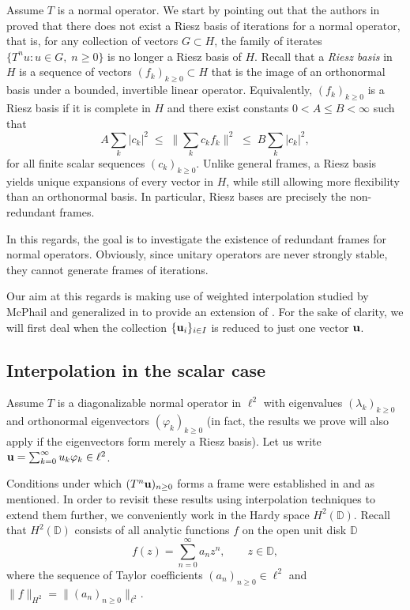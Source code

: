 \documentclass[11pt]{amsart}
\theoremstyle{definition}
\theoremstyle{remark}
\numberwithin{equation}{section}
\def\DD{{\mathbb D}}
\def\phi{\varphi}
\newcommand{\uu}{\textnormal{\textbf{u}} }
\begin{document}
{\smallskip

Assume $T$ is a normal operator. We start  by pointing out that the authors in \cite{ACCMP17} proved  that there does not exist a Riesz basis of iterations
for a normal operator, that is, for any collection of vectors $G \subset H$, the family of iterates $\{T^n u : u \in G,\; n \ge 0\}$ is no longer a Riesz basis of $H$. Recall that a \emph{Riesz basis} in $H$ is a sequence of vectors
$(f_k)_{k\geq 0}\subset H$ that is the image of an orthonormal basis under a bounded,
invertible linear operator. Equivalently, $(f_k)_{k\geq 0}$ is a Riesz basis if it is complete
in $H$ and there exist constants $0<A\le B<\infty$ such that
\[
A \sum_k |c_k|^2 \;\le\;
\Big\|\sum_k c_k f_k\Big\|^2
\;\le\;
B \sum_k |c_k|^2,
\]
for all finite scalar sequences $(c_k)_{k\geq 0}$. Unlike general frames, a Riesz basis yields unique expansions of every vector in $H$,
while still allowing more flexibility than an orthonormal basis. In particular, Riesz bases are precisely the non-redundant frames.

\medskip

In this regards, the goal is to investigate the existence of redundant frames for normal operators. Obviously, since unitary operators are
never strongly stable, they cannot generate frames of iterations.
\smallskip

Our aim at this regards is making use of weighted interpolation studied by McPhail \cite{mcphail} and generalized in  \cite{JPP07} to provide an extension of \cite[Theorem~2.3]{CMPP20}. For the sake of clarity, we will first deal when the collection $\{\uu_i\}_{i\in I}$ is reduced to just one vector $\uu$.

\smallskip

\subsection*{Interpolation in the scalar case}

Assume $T$ is a diagonalizable normal operator in $\ell^2$  with eigenvalues $(\lambda_k)_{k \ge 0}$ and orthonormal eigenvectors $(\phi_k)_{k \ge 0}$ (in fact, the results we prove will also apply if the eigenvectors form merely a Riesz basis). Let us write $\uu=\sum_{k=0}^\infty u_k \phi_k \in \ell^2$.

\smallskip

Conditions under which $(T^n \uu)_{n \ge 0}$ forms a frame were established in
\cite{ACMT17} and \cite{CMPP20} as mentioned. In order to revisit these results using interpolation
techniques to extend them further, we conveniently work in the Hardy space $H^2(\DD)$. Recall that $H^2(\DD)$ consists of all analytic functions $f$ on the open unit disk $\mathbb{D}$
\[
f(z) = \sum_{n=0}^\infty a_n z^n, \qquad z \in \mathbb{D},
\]
where the sequence of Taylor coefficients $(a_n)_{n\ge 0} \in \ell^2$ and $\|f\|_{H^2}= \|(a_n)_{n\geq 0}\|_{\ell^2}$.


}
\end{document}
